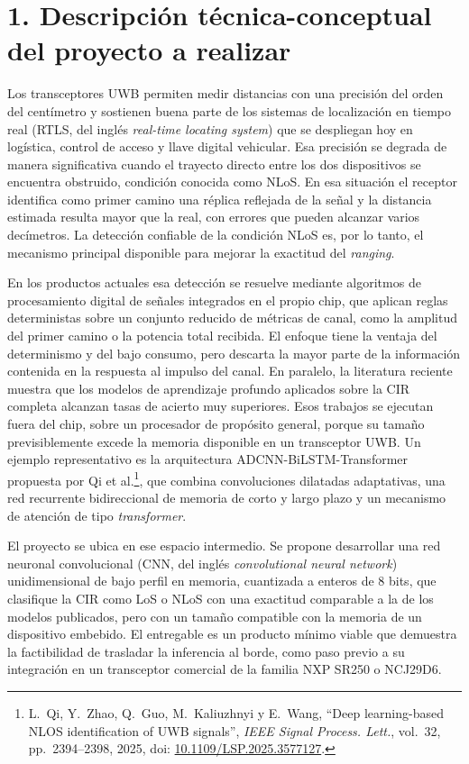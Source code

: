 \documentclass[
11pt, %
]{charter}
\begin{document}
\section{1. Descripción técnica-conceptual del proyecto a realizar}
\label{sec:descripcion}

Los transceptores UWB permiten medir distancias con una precisión del orden del centímetro y sostienen buena parte de los sistemas de localización en tiempo real (RTLS, del inglés \textit{real-time locating system}) que se despliegan hoy en logística, control de acceso y llave digital vehicular. Esa precisión se degrada de manera significativa cuando el trayecto directo entre los dos dispositivos se encuentra obstruido, condición conocida como NLoS. En esa situación el receptor identifica como primer camino una réplica reflejada de la señal y la distancia estimada resulta mayor que la real, con errores que pueden alcanzar varios decímetros. La detección confiable de la condición NLoS es, por lo tanto, el mecanismo principal disponible para mejorar la exactitud del \textit{ranging}.

En los productos actuales esa detección se resuelve mediante algoritmos de procesamiento digital de señales integrados en el propio chip, que aplican reglas deterministas sobre un conjunto reducido de métricas de canal, como la amplitud del primer camino o la potencia total recibida. El enfoque tiene la ventaja del determinismo y del bajo consumo, pero descarta la mayor parte de la información contenida en la respuesta al impulso del canal. En paralelo, la literatura reciente muestra que los modelos de aprendizaje profundo aplicados sobre la CIR completa alcanzan tasas de acierto muy superiores. Esos trabajos se ejecutan fuera del chip, sobre un procesador de propósito general, porque su tamaño previsiblemente excede la memoria disponible en un transceptor UWB. Un ejemplo representativo es la arquitectura ADCNN-BiLSTM-Transformer propuesta por Qi et al.\footnote{L.~Qi, Y.~Zhao, Q.~Guo, M.~Kaliuzhnyi y E.~Wang, ``Deep learning-based NLOS identification of UWB signals'', \textit{IEEE Signal Process. Lett.}, vol.~32, pp.~2394--2398, 2025, doi: \href{https://doi.org/10.1109/LSP.2025.3577127}{10.1109/LSP.2025.3577127}.}, que combina convoluciones dilatadas adaptativas, una red recurrente bidireccional de memoria de corto y largo plazo y un mecanismo de atención de tipo \textit{transformer}.

El proyecto se ubica en ese espacio intermedio. Se propone desarrollar una red neuronal convolucional (CNN, del inglés \textit{convolutional neural network}) unidimensional de bajo perfil en memoria, cuantizada a enteros de 8 bits, que clasifique la CIR como LoS o NLoS con una exactitud comparable a la de los modelos publicados, pero con un tamaño compatible con la memoria de un dispositivo embebido. El entregable es un producto mínimo viable que demuestra la factibilidad de trasladar la inferencia al borde, como paso previo a su integración en un transceptor comercial de la familia NXP SR250 o NCJ29D6.
\end{document}
